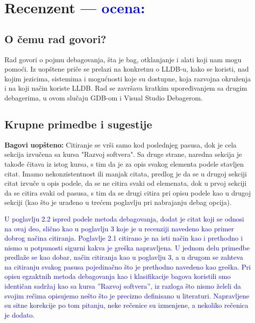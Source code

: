 \documentclass[a4paper]{report}
\newcommand{\odgovor}[1]{\textcolor{blue}{#1}}
\begin{document}
\chapter{Recenzent \odgovor{--- ocena:} }


\section{O čemu rad govori?}
Rad govori o pojmu debagovanja, šta je bag, otklanjanje i alati koji nam mogu pomoći. Iz uopštene priče se prelazi na konkretnu o LLDB-u, kako se koristi, nad kojim jezicima, sistemima i mogućnosti
koje su dostupne, koja razvojna okruženja i na koji način koriste LLDB. Rad se završava kratkim upoređivanjem sa drugim debagerima, u ovom slučaju GDB-om i Visual Studio Debagerom.

\section{Krupne primedbe i sugestije}
\textbf{Bagovi uopšteno:} Citiranje se vrši samo kod poslednjeg pasusa, dok je cela sekcija izvučena sa kursa "Razvoj softvera". Sa druge strane, naredna sekcija je takođe
čitava iz istog kursa, s tim da je za opis svakog elementa podele stavljen citat. Imamo nekonzistentnost ili manjak citata, predlog je da se u drugoj sekciji citat izvuče u opis podele,
da se ne citira svaki od elemenata, dok u prvoj sekciji da se citira svaki od pasusa, s tim da se drugi citira pri opisu podele kao u drugoj sekciji (kao što je urađeno u trećem poglavlju
pri nabrajanju debag opcija).

\odgovor{U poglavlju 2.2 ispred podele metoda debagovanja, dodat je citat koji se odnosi na ovaj deo, slično kao u poglavlju 3 koje je u recenziji navedeno kao primer dobrog načina citiranja. Poglavlje 2.1 citirano je na isti način kao i prethodno i nismo u potpunosti sigurni kakva je greška napravljena. U jednom delu primedbe predlaže se kao dobar, način citiranja kao u poglavlju 3, a u drugom se zahteva na citiranju svakog pasusa pojedinačno što je prethodno navedeno kao greška. Pri opisu egzaktnih metoda debagovanja kao i klasifikacije bagova koristili smo identičan sadržaj kao sa kursa ''Razvoj softvera'', iz razloga što nismo želeli da svojim rečima opisujemo nešto što je precizno definisano u literaturi. Napravljene su sitne korekcije po tom pitanju, neke rečenice su izmenjene, a nekoliko rečenica je dodato.}
\end{document}
